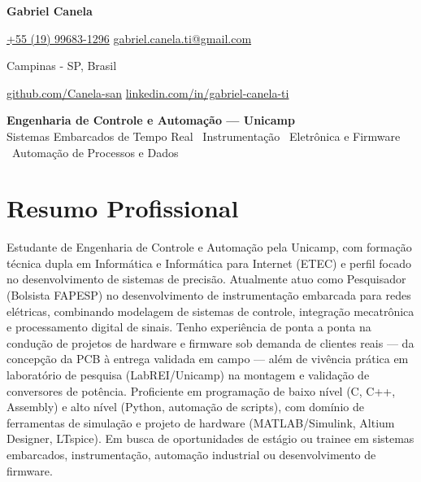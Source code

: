 \documentclass[a4paper,11pt]{article}
\begin{document}
\noindent
\begin{minipage}[t]{0.52\textwidth}
\textcolor{accent}{\textbf{\Huge Gabriel Canela}}
\end{minipage}%
\begin{minipage}[t]{0.48\textwidth}
\raggedleft

\href{tel:+5519996831296}{\faPhone \space +55 (19) 99683-1296} \quad
\href{mailto:gabriel.canela.ti@gmail.com}{\faEnvelope \space gabriel.canela.ti@gmail.com}

\vspace{2pt}

\faMapMarker \space Campinas - SP, Brasil

\vspace{2pt}

\href{https://github.com/Canela-san}{\faGithub \space github.com/Canela-san} \quad
\href{https://www.linkedin.com/in/gabriel-canela-ti/}{\faLinkedin \space linkedin.com/in/gabriel-canela-ti}
\end{minipage}

\vspace{0.6em}

\begin{center}
{\Large\bfseries\color{accent} Engenharia de Controle e Automação --- Unicamp}\\[3pt]
{\normalsize\color{graytext} Sistemas Embarcados de Tempo Real \textperiodcentered\ Instrumentação \textperiodcentered\ Eletrônica e Firmware \textperiodcentered\ Automação de Processos e Dados}
\end{center}

\vspace{0.3em}

\section*{Resumo Profissional}

Estudante de Engenharia de Controle e Automação pela Unicamp, com formação técnica dupla em Informática e Informática para Internet (ETEC) e perfil focado no desenvolvimento de sistemas de precisão. Atualmente atuo como Pesquisador (Bolsista FAPESP) no desenvolvimento de instrumentação embarcada para redes elétricas, combinando modelagem de sistemas de controle, integração mecatrônica e processamento digital de sinais. Tenho experiência de ponta a ponta na condução de projetos de hardware e firmware sob demanda de clientes reais --- da concepção da PCB à entrega validada em campo --- além de vivência prática em laboratório de pesquisa (LabREI/Unicamp) na montagem e validação de conversores de potência. Proficiente em programação de baixo nível (C, C++, Assembly) e alto nível (Python, automação de scripts), com domínio de ferramentas de simulação e projeto de hardware (MATLAB/Simulink, Altium Designer, LTspice). %
Em busca de oportunidades de estágio ou trainee em sistemas embarcados, instrumentação, automação industrial ou desenvolvimento de firmware.
\end{document}
